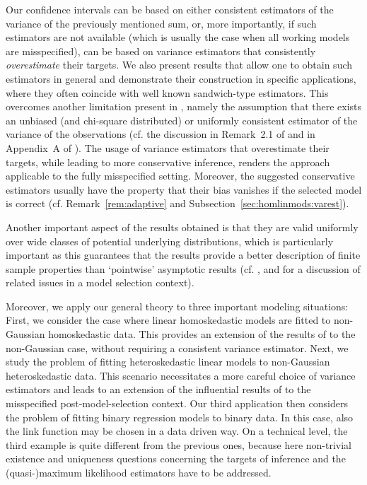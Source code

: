 \documentclass[preprint]{imsart}
\numberwithin{equation}{section}
\begin{document}
Our confidence intervals can be based on either consistent estimators of the variance of the previously mentioned sum, or, more importantly, if such estimators are not available (which is usually the case when all working models are misspecified), can be based on variance estimators that consistently \emph{overestimate} their targets. We also present results that allow one to obtain such estimators in general and demonstrate their construction in specific applications, where they often coincide with well known sandwich-type estimators. This overcomes another limitation present in \cite{Berk13}, namely the assumption that there exists an unbiased (and chi-square distributed) or uniformly consistent estimator of the variance of the observations (cf. the discussion in Remark~2.1 of \cite{leeb13various} and in Appendix~A of \cite{bachoc14valid}). The usage of variance estimators that overestimate their targets, while leading to more conservative inference, renders the approach applicable to the fully misspecified setting. Moreover, the suggested conservative estimators usually have the property that their bias vanishes if the selected model is correct (cf. Remark~\ref{rem:adaptive} and Subsection~\ref{sec:homlinmods:varest}).

Another important aspect of the results obtained is that they are valid uniformly over wide classes of potential underlying distributions, which is particularly important as this guarantees that the results provide a better description of finite sample properties than `pointwise' asymptotic results (cf. \cite{leeb03finite}, \cite{leeb05model} and \cite{Tib15a} for a discussion of related issues in a model selection context).

Moreover, we apply our general theory to three important modeling situations: First, we consider the case where linear homoskedastic models are fitted to non-Gaussian homoskedastic data. This provides an extension of the results of \cite{Berk13} to the non-Gaussian case, without requiring a consistent variance estimator. Next, we study the problem of fitting heteroskedastic linear models to non-Gaussian heteroskedastic data. This scenario necessitates a more careful choice of variance estimators and leads to an extension of the influential results of \cite{eicker67} to the misspecified post-model-selection context. Our third application then considers the problem of fitting binary regression models to binary data. In this case, also the link function may be chosen in a data driven way. On a technical level, the third example is quite different from the previous ones, because here non-trivial existence and uniqueness questions concerning the targets of inference and the (quasi-)maximum likelihood estimators have to be addressed. 
\end{document}

